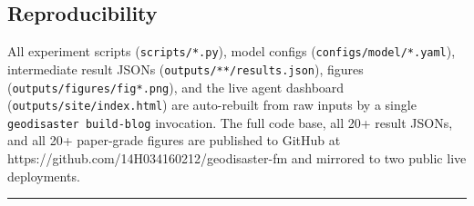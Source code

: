 \subsection{Reproducibility}\label{reproducibility}

All experiment scripts (\texttt{scripts/*.py}), model configs (\texttt{configs/model/*.yaml}),
intermediate result JSONs (\texttt{outputs/**/results.json}), figures
(\texttt{outputs/figures/fig*.png}), and the live agent dashboard
(\texttt{outputs/site/index.html}) are auto-rebuilt from raw inputs by a single
\texttt{geodisaster\ build-blog} invocation. The full code base, all 20+ result
JSONs, and all 20+ paper-grade figures are published to GitHub at
https://github.com/14H034160212/geodisaster-fm and mirrored to two public
live deployments.

\begin{center}\rule{0.5\linewidth}{0.5pt}\end{center}
